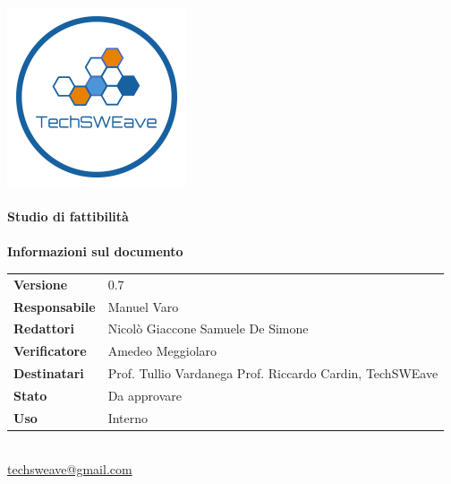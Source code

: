 \documentclass[a4paper]{article}
\begin{document}
\begin{titlepage}
    \begin{center}
        \includegraphics{../../../Images/logo}\\
        \vspace{20px}
        \textcolor{logo}{\hrulefill}\\
        \vspace{20px}
        \textbf{\huge\textcolor{logo}{Studio di fattibilità}}\\
        \vspace{10px}
        \textcolor{logo}{\hrulefill}\\
        \vspace{40px}
        \textbf{\Large Informazioni sul documento}\\
        \vspace{20px}
        \begin{tabular}{p{100px} | p{100px}}
            \textbf{Versione}     & 0.7                                                                        \\
            \textbf{Responsabile} & Manuel Varo                                                                \\
            \textbf{Redattori}    & Nicolò Giaccone \newline Samuele De Simone                                 \\
            \textbf{Verificatore} & Amedeo Meggiolaro                                                          \\
            \textbf{Destinatari}  & Prof. Tullio Vardanega \newline Prof. Riccardo Cardin, \newline TechSWEave \\
            \textbf{Stato}        & Da approvare                                                               \\
            \textbf{Uso}          & Interno                                                                    \\
        \end{tabular}\\
        \vspace{60px}
        \href{mailto:techsweave@gmail.com}{techsweave@gmail.com}\\

    \end{center}
\end{titlepage}
\end{document}
